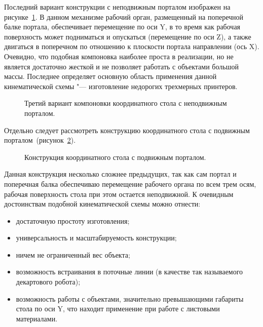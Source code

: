 Последний вариант конструкции с неподвижным порталом изображен на рисунке~\cref{fig:coord-3}. В данном механизме рабочий орган, размещенный на поперечной балке портала, обеспечивает перемещение по оси Y, в то время как рабочая поверхность может подниматься и опускаться (перемещение по оси Z), а также двигаться в поперечном по отношению к плоскости портала направлении (ось X). Очевидно, что подобная компоновка наиболее проста в реализации, но не является достаточно жесткой и не позволяет работать с объектами большой массы. Последнее определяет основную область применения данной кинематической схемы "--- изготовление недорогих трехмерных принтеров.

\begin{figure}[ht]
	\caption{Третий вариант компоновки координатного стола с неподвижным порталом.}\label{fig:coord-3}
\end{figure}

Отдельно следует рассмотреть конструкцию координатного стола с подвижным порталом~(рисунок~\cref{fig:coord-4}).

\begin{figure}[ht]
	\caption{Конструкция координатного стола с подвижным порталом.}\label{fig:coord-4}
\end{figure}

Данная конструкция несколько сложнее предыдущих, так как сам портал и поперечная балка обеспечиваю перемещение рабочего органа по всем трем осям, рабочая поверхность стола при этом остается неподвижной. К очевидным достоинствам подобной кинематической схемы можно отнести:

\begin{itemize}
	\item достаточную простоту изготовления;
	
	\item универсальность и масштабируемость конструкции;
	
	\item ничем не ограниченный вес объекта;
	
	\item возможность встраивания в поточные линии (в качестве так называемого декартового робота);
	
	\item возможность работы с объектами, значительно превышающими габариты стола по оси Y, что находит применение при работе с листовыми материалами.
\end{itemize}

